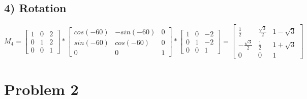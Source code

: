\documentclass[12pt,pdftex,a4paper]{article}
\begin{document}
\subsection*{4) Rotation}
\[
M_4=
\begin{bmatrix}
1 & 0 & 2\\
0 & 1 & 2\\
0 & 0 & 1
\end{bmatrix}
*
\begin{bmatrix}
cos(-60) & -sin(-60) & 0\\
sin(-60) & cos(-60) & 0\\
0 & 0 & 1
\end{bmatrix}
*
\begin{bmatrix}
1 & 0 & -2\\
0 & 1 & -2\\
0 & 0 & 1
\end{bmatrix}
=
\begin{bmatrix}
\frac{1}{2} & \frac{\sqrt{3}}{2} & 1-\sqrt{3}\\
-\frac{\sqrt{3}}{2} & \frac{1}{2} & 1+\sqrt{3}\\
0 & 0 & 1

\end{bmatrix}
\]

\section*{Problem 2}
\end{document}
